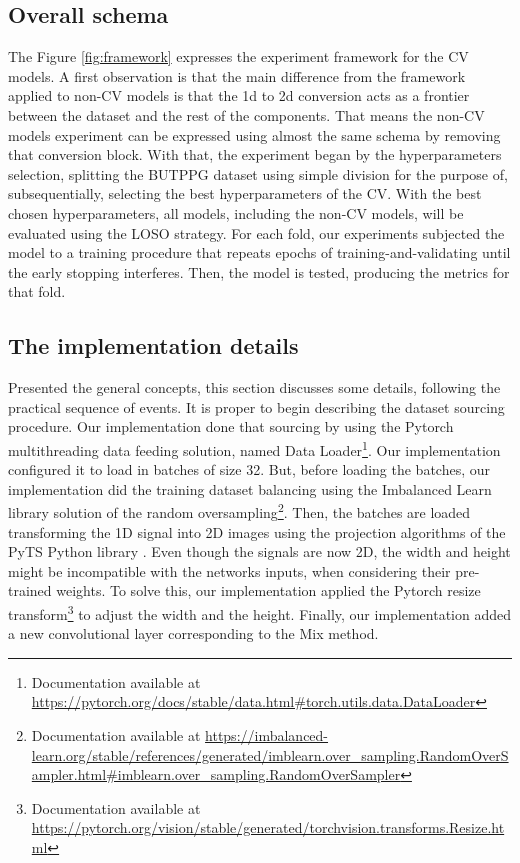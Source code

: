 \subsection{Overall schema}



The Figure \ref{fig:framework} expresses the experiment framework for the \gls{CV} models. A first observation is that the main difference from the framework applied to non-\gls{CV} models is that the 1d to 2d conversion acts as a frontier between the dataset and the rest of the components. That means the non-\gls{CV} models experiment can be expressed using almost the same schema by removing that conversion block. With that, the experiment began by the hyperparameters selection, splitting the \gls{BUTPPG} dataset using simple division for the purpose of, subsequentially, selecting the best hyperparameters of the \gls{CV}. With the best chosen hyperparameters, all models, including the non-\gls{CV} models, will be evaluated using the \gls{LOSO} strategy. For each fold, our experiments subjected the model to a training procedure that repeats epochs of training-and-validating until the early stopping interferes. Then, the model is tested, producing the metrics for that fold.

\subsection{The implementation details}

Presented the general concepts, this section discusses some details, following the practical sequence of events. It is proper to begin describing the dataset sourcing procedure. Our implementation done that sourcing by using the Pytorch multithreading data feeding solution, named Data Loader\footnote{Documentation available at \url{https://pytorch.org/docs/stable/data.html\#torch.utils.data.DataLoader}}. Our implementation configured it to load in batches of size 32. But, before loading the batches, our implementation did the training dataset balancing using the Imbalanced Learn library \cite{ImbalancedLearn} solution of the random oversampling\footnote{Documentation available at \url{https://imbalanced-learn.org/stable/references/generated/imblearn.over_sampling.RandomOverSampler.html\#imblearn.over_sampling.RandomOverSampler}}. Then, the batches are loaded transforming the 1D signal into 2D images using the projection algorithms of the PyTS Python library \cite{PyTS}. Even though the signals are now 2D, the width and height might be incompatible with the networks inputs, when considering their pre-trained weights. To solve this, our implementation applied the Pytorch resize transform\footnote{Documentation available at \url{https://pytorch.org/vision/stable/generated/torchvision.transforms.Resize.html}} to adjust the width and the height. Finally, our implementation added a new convolutional layer corresponding to the \gls{Mix} method.

